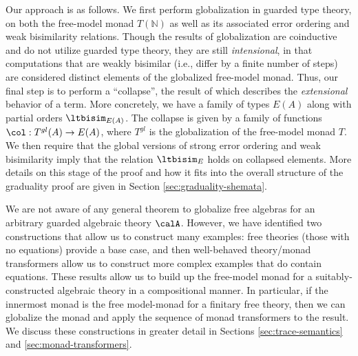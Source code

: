 \documentclass[acmsmall,screen,review,anonymous]{acmart}
\theoremstyle{remark}
\begin{document}
Our approach is as follows. We first perform globalization in guarded type
theory, on both the free-model monad $T(\mathbb{N})$ as well as its associated
error ordering and weak bisimilarity relations. Though the results of
globalization are coinductive and do not utilize guarded type theory, they are
still \emph{intensional}, in that computations that are weakly bisimilar (i.e.,
differ by a finite number of steps) are considered distinct elements of the
globalized free-model monad. Thus, our final step is to perform a ``collapse'',
the result of which describes the \emph{extensional} behavior of a term.
%
More concretely, we have a family of types $E(A)$ along with partial orders
$\ltbisim_{E(A)}$. The collapse is given by a family of functions $\col :
T^{gl}(A) \to E(A)$, where $T^{gl}$ is the globalization of the free-model monad
$T$. We then require that the global versions of strong error ordering and weak
bisimilarity imply that the relation $\ltbisim_E$ holds on collapsed elements.
%
More details on this stage of the proof and how it fits into the overall
structure of the graduality proof are given in Section
\ref{sec:graduality-shemata}. 

We are not aware of any general theorem to globalize free algebras for
an arbitrary guarded algebraic theory $\calA$. However, we have
identified two constructions that allow us to construct many examples:
free theories (those with no equations) provide a base case, and then
well-behaved theory/monad transformers allow us to construct more
complex examples that do contain equations.
%
These results allow us to build up the free-model monad for a
suitably-constructed algebraic theory in a compositional manner. In particular,
if the innermost monad is the free model-monad for a finitary free theory, then
we can globalize the monad and apply the sequence of monad transformers to the
result.
%
We discuss these constructions in greater detail in Sections
\ref{sec:trace-semantics} and \ref{sec:monad-transformers}.

\end{document}
